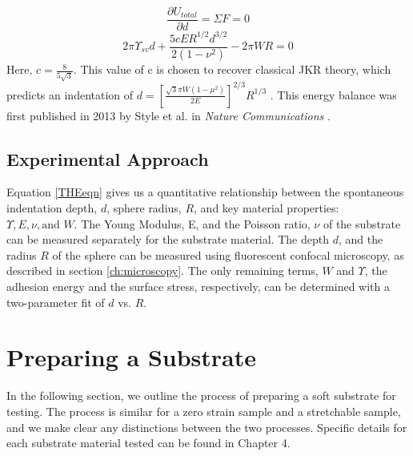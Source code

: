 \begin{equation*}
\frac{\partial U_{total}}{\partial d} = \Sigma F = 0
\end{equation*}
\begin{equation}
\label{THEeqn}
2 \pi \Upsilon_{sv}d  + \frac{5cER^{1/2}d^{3/2}}{2 \left( 1-\nu ^2 \right) }  - 2 \pi WR = 0
\end{equation}
Here,  $ c = \frac{8}{5\sqrt{3}} $. This value of c is chosen to recover classical JKR theory, which predicts an indentation of $ d =  \left[\frac{\sqrt{3}\pi W (1 - \mu^2)}{2E} \right]^{2/3}R^{1/3}$ \cite{style2013surface, jensen2015wetting,johnson1971surface}. This energy balance was first published in 2013 by Style et al. in \textit{Nature Communications} \cite{style2013surface}. 

\subsection{Experimental Approach}
Equation \ref{THEeqn} gives us a quantitative relationship between the spontaneous indentation depth, $ d $, sphere radius, $ R $, and key material properties: $ \Upsilon, E, \nu, \text{and }W $. The Young Modulus, E, and the Poisson ratio, $\nu$ of the substrate can be measured separately for the substrate material. The depth $d$, and the radius $R$ of the sphere can be measured using fluorescent confocal microscopy, as described in section \ref{ch:microscopy}. The only remaining terms, $W$ and $\Upsilon$, the adhesion energy and the surface stress, respectively, can be determined with a two-parameter fit of $ d $ vs. $ R. $

\section{Preparing a Substrate}
In the following section, we outline the process of preparing a soft substrate for testing. The process is similar for a zero strain sample and a stretchable sample, and we make clear any distinctions between the two processes. Specific details for each substrate material tested can be found in Chapter 4.

